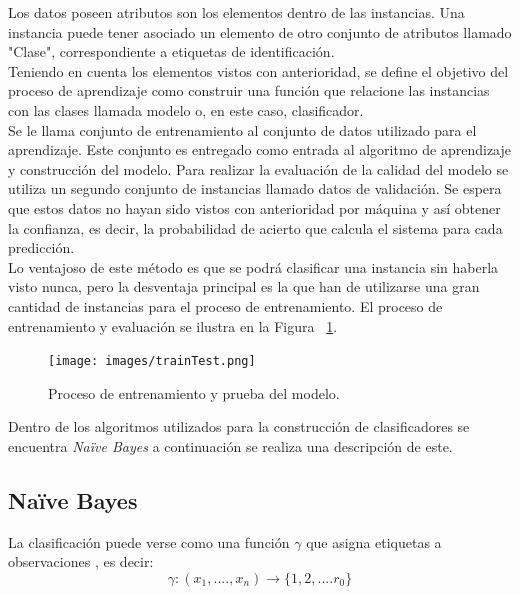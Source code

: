 Los datos poseen atributos son los elementos dentro de las instancias. Una instancia puede tener asociado un elemento de otro conjunto de atributos llamado "Clase", correspondiente a etiquetas de identificación.\\

Teniendo en cuenta los elementos vistos con anterioridad, se define el objetivo del proceso de aprendizaje como construir una función que relacione las instancias con las clases llamada modelo o, en este caso, clasificador.\\

Se le llama conjunto de entrenamiento al conjunto de datos utilizado para el aprendizaje. Este conjunto es entregado como entrada al algoritmo de aprendizaje y construcción del modelo. Para realizar la evaluación de la calidad del modelo se utiliza un segundo conjunto de instancias llamado datos de validación. Se espera que estos datos no hayan sido vistos con anterioridad por máquina y así obtener la confianza, es decir, la probabilidad de acierto que calcula el sistema para cada predicción.\\

Lo ventajoso de este método es que se podrá clasificar una instancia sin haberla visto nunca, pero la desventaja principal es la que han de utilizarse una gran cantidad de instancias para el proceso de entrenamiento. El proceso de entrenamiento y evaluación se ilustra en la Figura ~\ref{fig:entrenamientoEvaluacion}.\\

\begin{figure}[H]
	\centering
	\captionsetup{justification=centering}
	\texttt{[image: images/trainTest.png]}
	\caption[Proceso de entrenamiento y prueba del modelo.]{Proceso de entrenamiento y prueba del modelo.}
	\label{fig:entrenamientoEvaluacion}
\end{figure}

Dentro de los algoritmos utilizados para la construcción de clasificadores se encuentra \textit{Naïve Bayes} \cite{NaiveBayes2} a continuación se realiza una descripción de este. 

	\subsection{Naïve Bayes}
	\label{subsec:naiveBayes}
	
	La clasificación puede verse como una función \begin{math}\gamma\end{math} que asigna etiquetas a observaciones \cite{NaiveBayes1}, es decir:\\ 
	\[\gamma : (x_{1}, .... , x_{n}) \rightarrow \{1, 2, .... r_{0}\} \]

